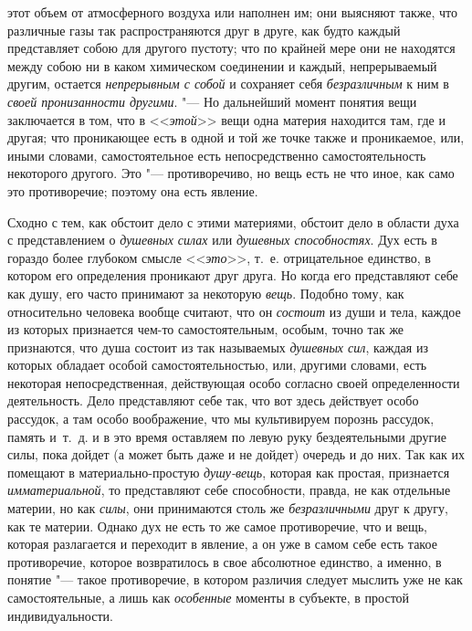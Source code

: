этот объем от атмосферного воздуха или наполнен им; они выясняют также, что
различные газы так распространяются друг в друге, как будто каждый
представляет собою для другого пустоту; что по крайней мере они не
находятся между собою ни в каком химическом соединении и каждый,
непрерываемый другим, остается {\em непрерывным с
собой} и сохраняет себя {\em безразличным} к ним в
{\em своей пронизанности другими}. "--- Но дальнейший
момент понятия вещи заключается в том, что в
<<{\em этой}>> вещи одна материя находится там, где и
другая; что проникающее есть в одной и той же точке также и проникаемое,
или, иными словами, самостоятельное есть непосредственно самостоятельность
некоторого другого. Это "--- противоречиво, но вещь есть не что иное, как само
это противоречие; поэтому она есть явление.

Сходно с тем, как обстоит дело с этими материями, обстоит дело в области
духа с представлением о {\em душевных силах} или
{\em душевных способностях}. Дух есть в гораздо более
глубоком смысле <<{\em это}>>, т.~е. отрицательное
единство, в котором его определения проникают друг друга. Но когда его
представляют себе как душу, его часто принимают за некоторую
{\em вещь}. Подобно тому, как относительно человека
вообще считают, что он {\em состоит} из души и тела,
каждое из которых признается чем-то самостоятельным, особым, точно так же
признаются, что душа состоит из так называемых
{\em душевных сил}, каждая из которых обладает особой
самостоятельностью, или, другими словами, есть некоторая непосредственная,
действующая особо согласно своей определенности деятельность. Дело
представляют себе так, что вот здесь действует особо рассудок, а там особо
воображение, что мы культивируем порознь рассудок, память и~т.~д. и в это
время оставляем по левую руку бездеятельными другие силы, пока дойдет (а
может быть даже и не дойдет) очередь и до них. Так как их помещают в
материально-простую {\em душу-вещь}, которая как
простая, признается {\em имматериальной}, то
представляют себе способности, правда, не как отдельные материи, но как
{\em силы}, они принимаются столь же
{\em безразличными} друг к другу, как те материи.
Однако дух не есть то же самое противоречие, что и вещь, которая
разлагается и переходит в явление, а он уже в самом себе есть такое
противоречие, которое возвратилось в свое абсолютное единство, а именно, в
понятие "--- такое противоречие, в котором различия следует мыслить уже не как
самостоятельные, а лишь как {\em особенные} моменты в
субъекте, в простой индивидуальности.
